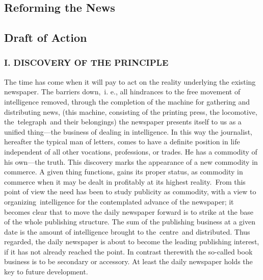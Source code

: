 \documentclass[twoside,symmetric,nobib,justified]{tufte-book}
\let\oldchapter\chapter
\def\chapter{%
  \setcounter{footnote}{0}%
  \oldchapter
}
\begin{document}
\mainmatter{}\setcounter{page}{1}

\thispagestyle{plain} %
\mbox{}


\begin{fullwidth}

\part{Reforming the News}


\end{fullwidth}

\chapter[Draft of Action]{Draft of Action}
\label{ch:Draft of Action}

\vspace{.2in}

\begin{LARGE}


\end{LARGE}

\vspace{0.5in}

\hypertarget{i-discovery-of-the-principle}{%
\section{I. DISCOVERY OF THE
PRINCIPLE}\label{i-discovery-of-the-principle}}

The time has come when it will pay to act on the reality underlying the
existing newspaper. The barriers down,~i. e., all hindrances to the free
movement of intelligence removed, through the completion of the machine
for gathering and distributing news, (this machine, consisting of the
printing press, the locomotive, the~telegraph~and their belongings) the
newspaper presents itself to us as a unified thing---the business of
dealing in intelligence. In this way the journalist, hereafter the
typical man of letters, comes to have a definite position in life
independent of all other vocations, professions, or trades. He has a
commodity of his own---the truth. This discovery marks the appearance of
a new commodity in commerce. A given thing functions, gains its proper
status, as commodity in commerce when it may be dealt in profitably at
its highest reality.~From this point of view the need has been to study
publicity as commodity, with a view to organizing~intelligence for the
contemplated advance of the newspaper; it becomes clear that to move the
daily newspaper forward is to strike at the base of the whole publishing
structure. The sum of the publishing business at a given date is the
amount of intelligence brought to the~centre~and distributed. Thus
regarded, the daily newspaper is about to become the leading publishing
interest, if it has not already reached the point. In contrast therewith
the so-called book business is to be secondary or accessory. At least
the daily newspaper holds the key to future development.~~
\end{document}
